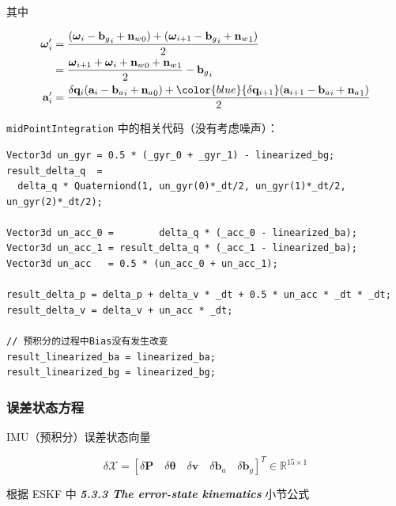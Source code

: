 \documentclass[12pt,a4paper]{article}
\begin{document}
其中

\begin{equation}
\begin{aligned}
\boldsymbol{\omega}_{i}' 
&= 
\frac{(\boldsymbol{\omega}_i-{\mathbf{b}_g}_i+{\mathbf{n}_w}_0)+(\boldsymbol{\omega}_{i+1}-{\mathbf{b}_g}_i+{\mathbf{n}_w}_1)}{2} \\
&= 
\frac{\boldsymbol{\omega}_{i+1}+\boldsymbol{\omega}_{i}+{\mathbf{n}_w}_0+{\mathbf{n}_w}_1}{2}-{\mathbf{b}_g}_i \\
\mathbf{a}_{i}' 
&= 
\frac{\delta \mathbf{q}_{i} (\mathbf{a}_{i}-{\mathbf{b}_a}_i+{\mathbf{n}_a}_0)+
{\color{blue}{\delta \mathbf{q}_{i+1}}}(\mathbf{a}_{i+1}-{\mathbf{b}_a}_i+{\mathbf{n}_a}_1)}{2}
\end{aligned}
\end{equation}

\verb|midPointIntegration| 中的相关代码（没有考虑噪声）：  

\begin{lstlisting}
Vector3d un_gyr = 0.5 * (_gyr_0 + _gyr_1) - linearized_bg;
result_delta_q  = 
  delta_q * Quaterniond(1, un_gyr(0)*_dt/2, un_gyr(1)*_dt/2, un_gyr(2)*_dt/2);

Vector3d un_acc_0 =        delta_q * (_acc_0 - linearized_ba);
Vector3d un_acc_1 = result_delta_q * (_acc_1 - linearized_ba);
Vector3d un_acc   = 0.5 * (un_acc_0 + un_acc_1);

result_delta_p = delta_p + delta_v * _dt + 0.5 * un_acc * _dt * _dt;
result_delta_v = delta_v + un_acc * _dt;

// 预积分的过程中Bias没有发生改变
result_linearized_ba = linearized_ba;
result_linearized_bg = linearized_bg;
\end{lstlisting}

\subsubsection{误差状态方程}

IMU（预积分）误差状态向量  

\begin{equation}
\delta \mathcal{X} =
[
\delta \mathbf{P} \quad 
\delta \boldsymbol{\theta} \quad 
\delta \mathbf{v} \quad 
\delta \mathbf{b}_a \quad 
\delta \mathbf{b}_g]^T
\in \mathbb{R}^{15 \times 1}
\end{equation}

根据 \cite{DBLP:journals/corr/abs-1711-02508} ESKF 中 \textit{\textbf{5.3.3 The error-state kinematics}} 小节公式  
\end{document}
